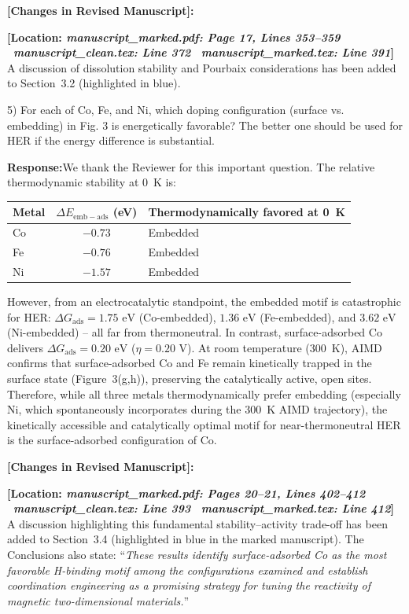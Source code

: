 \documentclass[11pt, sans, a4paper]{moderncv}
\newcommand{\response}{\vspace{0.4em}\noindent\textbf{\color{actionblue}Response:}\hspace{0.5em}}
\newcommand{\manuscriptchange}[1]{\vspace{0.4em}\noindent\textbf{\color{acsblue}[Changes in Revised Manuscript]:}\par\nopagebreak\vspace{0.15em}#1\vspace{0.4em}}
\begin{document}
\manuscriptchange{\textbf{[Location: \textit{manuscript\_marked.pdf: Page 17, Lines 353--359} \textbar\ \textit{manuscript\_clean.tex: Line 372} \textbar\ \textit{manuscript\_marked.tex: Line 391}]}\\ A discussion of dissolution stability and Pourbaix considerations has been added to Section~3.2 (highlighted in blue).}

\vspace{0.8em}

\begin{reviewercomment}
5) For each of Co, Fe, and Ni, which doping configuration (surface vs. embedding) in Fig. 3 is energetically favorable? The better one should be used for HER if the energy difference is substantial.
\end{reviewercomment}

\response We thank the Reviewer for this important question. The relative thermodynamic stability at 0~K is:
\begin{center}
\small
\begin{tabular}{lcl}
\toprule
Metal & $\Delta E_{\mathrm{emb-ads}}$ (eV) & Thermodynamically favored at 0~K \\
\midrule
Co    & $-0.73$                            & Embedded                         \\
Fe    & $-0.76$                            & Embedded                         \\
Ni    & $-1.57$                            & Embedded                         \\
\bottomrule
\end{tabular}
\end{center}

However, from an electrocatalytic standpoint, the embedded motif is catastrophic for HER: $\Delta G_{\mathrm{ads}} = 1.75\text{ eV}$ (Co-embedded), $1.36\text{ eV}$ (Fe-embedded), and $3.62\text{ eV}$ (Ni-embedded) -- all far from thermoneutral. In contrast, surface-adsorbed Co delivers $\Delta G_{\mathrm{ads}} = 0.20\text{ eV}$ ($\eta = 0.20\text{ V}$). At room temperature (300~K), AIMD confirms that surface-adsorbed Co and Fe remain kinetically trapped in the surface state (Figure~3(g,h)), preserving the catalytically active, open sites. Therefore, while all three metals thermodynamically prefer embedding (especially Ni, which spontaneously incorporates during the 300~K AIMD trajectory), the kinetically accessible and catalytically optimal motif for near-thermoneutral HER is the surface-adsorbed configuration of Co.

\manuscriptchange{\textbf{[Location: \textit{manuscript\_marked.pdf: Pages 20--21, Lines 402--412} \textbar\ \textit{manuscript\_clean.tex: Line 393} \textbar\ \textit{manuscript\_marked.tex: Line 412}]}\\ A discussion highlighting this fundamental stability--activity trade-off has been added to Section~3.4 (highlighted in blue in the marked manuscript). The Conclusions also state: ``\textit{These results identify surface-adsorbed Co as the most favorable H-binding motif among the configurations examined and establish coordination engineering as a promising strategy for tuning the reactivity of magnetic two-dimensional materials.}''}
\end{document}
